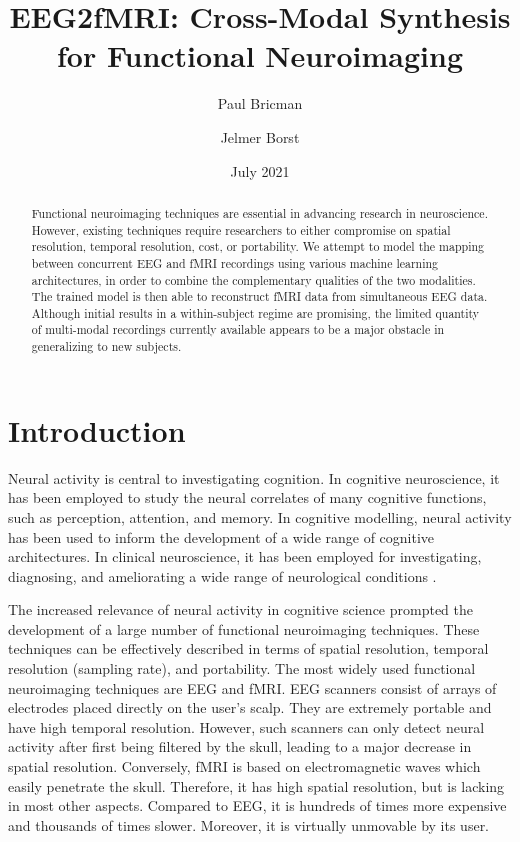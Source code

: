 \documentclass{article}
\title{EEG2fMRI: Cross-Modal Synthesis for Functional Neuroimaging}
\author{Paul Bricman}
\author{Jelmer Borst}
\affil{University of Groningen}
\date{July 2021}
\begin{document}
\maketitle

\begin{abstract}
    Functional neuroimaging techniques are essential in advancing research in neuroscience. However, existing techniques require researchers to either compromise on spatial resolution, temporal resolution, cost, or portability. We attempt to model the  mapping between concurrent EEG and fMRI recordings using various machine learning architectures, in order to combine the complementary qualities of the two modalities. The trained model is then able to reconstruct fMRI data from simultaneous EEG data. Although initial results in a within-subject regime are promising, the limited quantity of multi-modal recordings currently available appears to be a major obstacle in generalizing to new subjects.
\end{abstract}

\section{Introduction}

Neural activity is central to investigating cognition. In cognitive neuroscience, it has been employed to study the neural correlates of many cognitive functions, such as perception, attention, and memory. In cognitive modelling, neural activity has been used to inform the development of a wide range of cognitive architectures. In clinical neuroscience, it has been employed for investigating, diagnosing, and ameliorating a wide range of neurological conditions \cite{n_functional_2015}.

The increased relevance of neural activity in cognitive science prompted the development of a large number of functional neuroimaging techniques. These techniques can be effectively described in terms of spatial resolution, temporal resolution (sampling rate), and portability. The most widely used functional neuroimaging techniques are EEG and fMRI. EEG scanners consist of arrays of electrodes placed directly on the user's scalp. They are extremely portable and have high temporal resolution. However, such scanners can only detect neural activity after first being filtered by the skull, leading to a major decrease in spatial resolution. Conversely, fMRI is based on electromagnetic waves which easily penetrate the skull. Therefore, it has high spatial resolution, but is lacking in most other aspects. Compared to EEG, it is hundreds of times more expensive and thousands of times slower. Moreover, it is virtually unmovable by its user.
\end{document}
